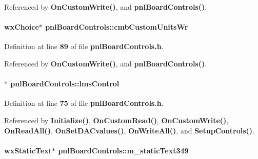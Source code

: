 Referenced by {\bf On\+Custom\+Write()}, and {\bf pnl\+Board\+Controls()}.

\paragraph[{cmb\+Custom\+Units\+Wr}]{\setlength{\rightskip}{0pt plus 5cm}wx\+Choice$\ast$ pnl\+Board\+Controls\+::cmb\+Custom\+Units\+Wr\hspace{0.3cm}{\ttfamily [protected]}}\label{classpnlBoardControls_ac724e108b6b4c3e18c138eeb09252ee1}


Definition at line {\bf 89} of file {\bf pnl\+Board\+Controls.\+h}.



Referenced by {\bf On\+Custom\+Write()}, and {\bf pnl\+Board\+Controls()}.

\paragraph[{lms\+Control}]{$\ast$ pnl\+Board\+Controls\+::lms\+Control}\label{classpnlBoardControls_a03949237852db9f12268f0c7762ec89e}


Definition at line {\bf 75} of file {\bf pnl\+Board\+Controls.\+h}.



Referenced by {\bf Initialize()}, {\bf On\+Custom\+Read()}, {\bf On\+Custom\+Write()}, {\bf On\+Read\+All()}, {\bf On\+Set\+D\+A\+Cvalues()}, {\bf On\+Write\+All()}, and {\bf Setup\+Controls()}.

\paragraph[{m\+\_\+static\+Text349}]{\setlength{\rightskip}{0pt plus 5cm}wx\+Static\+Text$\ast$ pnl\+Board\+Controls\+::m\+\_\+static\+Text349\hspace{0.3cm}{\ttfamily [protected]}}\label{classpnlBoardControls_a0a893eb9cce1c3bfab35d3085f45c4ff}


